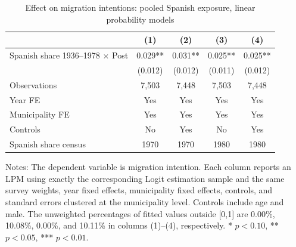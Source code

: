 \begin{table}[!htbp]
\normalsize
\renewcommand{\arraystretch}{1.15}
\centering
\caption{Effect on migration intentions: pooled Spanish exposure, linear probability models}
\label{tab:post_pooled_share_lpm_stata}
\setlength{\tabcolsep}{4pt}
\captionsetup{justification=centering}
\begin{tabular}{lcccc}
\hline
 & (1) & (2) & (3) & (4) \\
\hline
Spanish share 1936--1978 \(\times\) Post & 0.029** & 0.031** & 0.025** & 0.025** \\
 & (0.012) & (0.012) & (0.011) & (0.012) \\
\hline
Observations &        7,503 &        7,448 &        7,503 &        7,448 \\
Year FE & Yes & Yes & Yes & Yes \\
Municipality FE & Yes & Yes & Yes & Yes \\
Controls & No & Yes & No & Yes \\
Spanish share census & 1970 & 1970 & 1980 & 1980 \\
\hline
\end{tabular}
\par\vspace{1.5mm}
\begin{minipage}{0.98\linewidth}
\footnotesize\setlength{\parindent}{0pt}\setlength{\parskip}{1pt}
Notes: The dependent variable is migration intention. Each column reports an LPM using exactly the corresponding Logit estimation sample and the same survey weights, year fixed effects, municipality fixed effects, controls, and standard errors clustered at the municipality level. Controls include age and male. The unweighted percentages of fitted values outside [0,1] are  0.00\%, 10.08\%,  0.00\%, and 10.11\% in columns (1)--(4), respectively. * \(p<0.10\), ** \(p<0.05\), *** \(p<0.01\).
\end{minipage}
\end{table}
